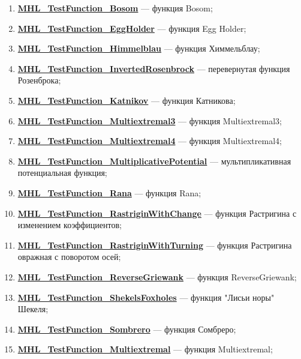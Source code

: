 \begin{enumerate}
 \item \hyperref[TestFunctions:section:MHL_TestFunction_Bosom]{\textbf{MHL\_TestFunction\_Bosom}} --- функция Bosom;
 \item \hyperref[TestFunctions:section:MHL_TestFunction_EggHolder]{\textbf{MHL\_TestFunction\_EggHolder}} --- функция Egg Holder;
 \item \hyperref[TestFunctions:section:MHL_TestFunction_Himmelblau]{\textbf{MHL\_TestFunction\_Himmelblau}} --- функция Химмельблау;
 \item \hyperref[TestFunctions:section:MHL_TestFunction_InvertedRosenbrock]{\textbf{MHL\_TestFunction\_InvertedRosenbrock}} --- перевернутая функция Розенброка;
 \item \hyperref[TestFunctions:section:MHL_TestFunction_Katnikov]{\textbf{MHL\_TestFunction\_Katnikov}} --- функция Катникова;
 \item \hyperref[TestFunctions:section:MHL_TestFunction_Multiextremal3]{\textbf{MHL\_TestFunction\_Multiextremal3}} --- функция Multiextremal3;
 \item \hyperref[TestFunctions:section:MHL_TestFunction_Multiextremal4]{\textbf{MHL\_TestFunction\_Multiextremal4}} --- функция Multiextremal4;
 \item \hyperref[TestFunctions:section:MHL_TestFunction_MultiplicativePotential]{\textbf{MHL\_TestFunction\_MultiplicativePotential}} --- мультипликативная потенциальная функция;
 \item \hyperref[TestFunctions:section:MHL_TestFunction_Rana]{\textbf{MHL\_TestFunction\_Rana}} --- функция Rana;
 \item \hyperref[TestFunctions:section:MHL_TestFunction_RastriginWithChange]{\textbf{MHL\_TestFunction\_RastriginWithChange}} --- функция Растригина с изменением коэффициентов;
 \item \hyperref[TestFunctions:section:MHL_TestFunction_RastriginWithTurning]{\textbf{MHL\_TestFunction\_RastriginWithTurning}} --- функция Растригина овражная с поворотом осей;
 \item \hyperref[TestFunctions:section:MHL_TestFunction_ReverseGriewank]{\textbf{MHL\_TestFunction\_ReverseGriewank}} --- функция ReverseGriewank;
 \item \hyperref[TestFunctions:section:MHL_TestFunction_ShekelsFoxholes]{\textbf{MHL\_TestFunction\_ShekelsFoxholes}} --- функция "Лисьи норы" Шекеля;
 \item \hyperref[TestFunctions:section:MHL_TestFunction_Sombrero]{\textbf{MHL\_TestFunction\_Sombrero}} --- функция Сомбреро;
 \item \hyperref[TestFunctions:section:MHL_TestFunction_Multiextremal]{\textbf{MHL\_TestFunction\_Multiextremal}} --- функция Multiextremal;

\end{enumerate}
